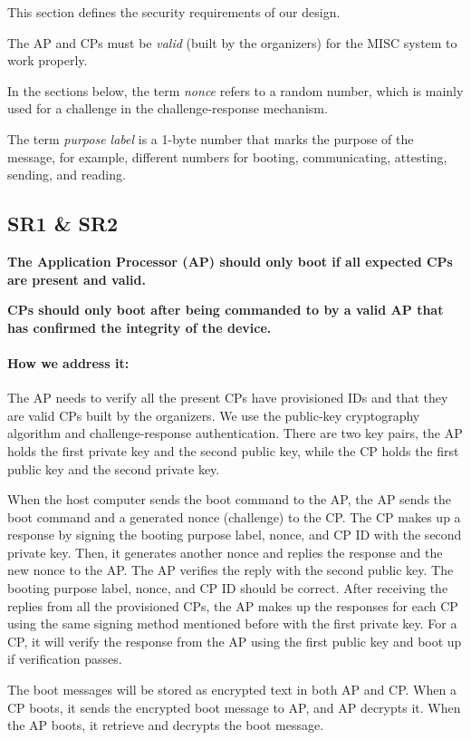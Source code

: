 \documentclass[11pt,oneside,onecolumn,letterpaper]{article}
\newcounter{alg}
\begin{document}
	This section defines the security requirements of our design.
	
	The AP and CPs must be \textit{valid} (built by the organizers) for the MISC system to work properly.
	
	In the sections below,
	the term \textit{nonce} refers to a random number,
	which is mainly used for a challenge in the challenge-response mechanism.
	
	The term \textit{purpose label} is a 1-byte number that marks the purpose of the message,
	for example,
	different numbers for booting,
	communicating,
	attesting,
	sending,
	and reading.
	
	\subsection{SR1 \& SR2}
	\textbf{The Application Processor (AP) should only boot if all expected CPs are present and valid.}
	
	\textbf{CPs should only boot after being commanded to by a valid AP that has confirmed the integrity of the device.}
	
	\paragraph{How we address it:}
	The AP needs to verify all the present CPs have provisioned IDs and that they are valid CPs built by the organizers.
	We use the public-key cryptography algorithm and challenge-response authentication.
	There are two key pairs,
	the AP holds the first private key and the second public key,
	while the CP holds the first public key and the second private key.
	
	When the host computer sends the boot command to the AP,
	the AP sends the boot command and a generated nonce (challenge) to the CP.
	The CP makes up a response by signing the booting purpose label,
	nonce,
	and CP ID with the second private key.
	Then,
	it generates another nonce and replies the response and the new nonce to the AP.
	The AP verifies the reply with the second public key.
	The booting purpose label,
	nonce,
	and CP ID should be correct.
	After receiving the replies from all the provisioned CPs,
	the AP makes up the responses for each CP using the same signing method mentioned before with the first private key.
	For a CP,
	it will verify the response from the AP using the first public key and boot up if verification passes.
	
	The boot messages will be stored as encrypted text in both AP and CP.
	When a CP boots,
	it sends the encrypted boot message to AP,
	and AP decrypts it.
	When the AP boots,
	it retrieve and decrypts the boot message.
	
\end{document}
